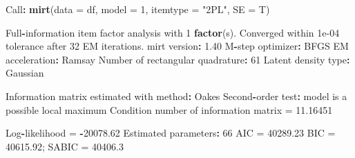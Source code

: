 \documentclass[
]{article}
\newenvironment{Shaded}{\begin{snugshade}}{\end{snugshade}}
\newcommand{\AttributeTok}[1]{\textcolor[rgb]{0.13,0.29,0.53}{#1}}
\newcommand{\DecValTok}[1]{\textcolor[rgb]{0.00,0.00,0.81}{#1}}
\newcommand{\FloatTok}[1]{\textcolor[rgb]{0.00,0.00,0.81}{#1}}
\newcommand{\FunctionTok}[1]{\textcolor[rgb]{0.13,0.29,0.53}{\textbf{#1}}}
\newcommand{\NormalTok}[1]{#1}
\newcommand{\OtherTok}[1]{\textcolor[rgb]{0.56,0.35,0.01}{#1}}
\newcommand{\SpecialCharTok}[1]{\textcolor[rgb]{0.81,0.36,0.00}{\textbf{#1}}}
\newcommand{\StringTok}[1]{\textcolor[rgb]{0.31,0.60,0.02}{#1}}
\begin{document}
\begin{Shaded}
\begin{Highlighting}[]
\NormalTok{Call}\SpecialCharTok{:}
\FunctionTok{mirt}\NormalTok{(}\AttributeTok{data =}\NormalTok{ df, }\AttributeTok{model =} \DecValTok{1}\NormalTok{, }\AttributeTok{itemtype =} \StringTok{"2PL"}\NormalTok{, }\AttributeTok{SE =}\NormalTok{ T)}

\NormalTok{Full}\SpecialCharTok{{-}}\NormalTok{information item factor analysis with }\DecValTok{1} \FunctionTok{factor}\NormalTok{(s).}
\NormalTok{Converged within }\FloatTok{1e{-}04}\NormalTok{ tolerance after }\DecValTok{32}\NormalTok{ EM iterations.}
\NormalTok{mirt version}\SpecialCharTok{:} \FloatTok{1.40} 
\NormalTok{M}\SpecialCharTok{{-}}\NormalTok{step optimizer}\SpecialCharTok{:}\NormalTok{ BFGS }
\NormalTok{EM acceleration}\SpecialCharTok{:}\NormalTok{ Ramsay }
\NormalTok{Number of rectangular quadrature}\SpecialCharTok{:} \DecValTok{61}
\NormalTok{Latent density type}\SpecialCharTok{:}\NormalTok{ Gaussian }

\NormalTok{Information matrix estimated with method}\SpecialCharTok{:}\NormalTok{ Oakes}
\NormalTok{Second}\SpecialCharTok{{-}}\NormalTok{order test}\SpecialCharTok{:}\NormalTok{ model is a possible local maximum}
\NormalTok{Condition number of information matrix }\OtherTok{=}  \FloatTok{11.16451}

\NormalTok{Log}\SpecialCharTok{{-}}\NormalTok{likelihood }\OtherTok{=} \SpecialCharTok{{-}}\FloatTok{20078.62}
\NormalTok{Estimated parameters}\SpecialCharTok{:} \DecValTok{66} 
\NormalTok{AIC }\OtherTok{=} \FloatTok{40289.23}
\NormalTok{BIC }\OtherTok{=} \FloatTok{40615.92}\NormalTok{; SABIC }\OtherTok{=} \FloatTok{40406.3}
\end{Highlighting}
\end{Shaded}
\end{document}
